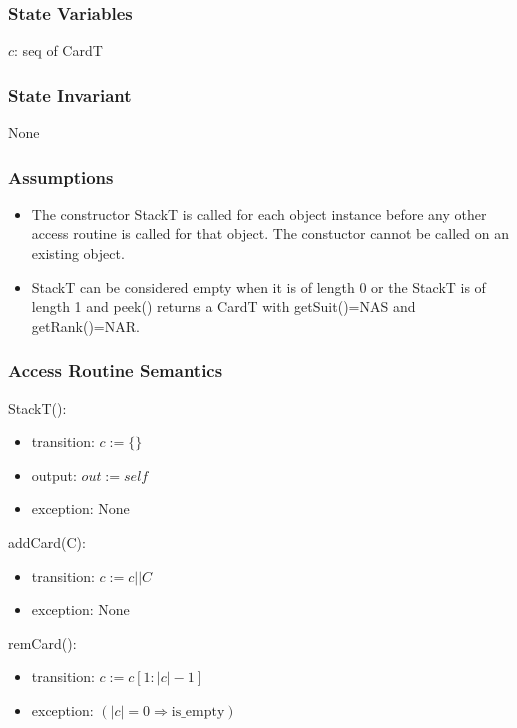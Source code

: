 \documentclass[12pt]{article}
\newcommand{\means}{\Rightarrow}
\newcommand{\m}[1]{\mbox{#1}}
\begin{document}
\subsubsection* {State Variables}

$c$: seq of CardT\\

\subsubsection* {State Invariant}

None

\subsubsection* {Assumptions}

\begin{itemize}
    \item The constructor StackT is called for each object instance
    before any other access routine is called for that object. The
    constuctor cannot be called on an existing object.
    \item StackT can be considered empty when it is of length 0 or the
    StackT is of length 1 and peek() returns a CardT with getSuit()=\m{NAS}
    and getRank()=\m{NAR}.
\end{itemize}

\subsubsection* {Access Routine Semantics}

StackT():
\begin{itemize}
    \item transition: $c := \{\}$
    \item output: $out := \mathit{self}$
    \item exception: None
\end{itemize}

\noindent addCard(C):
\begin{itemize}
    \item transition: $c := c||C$
    \item exception: None
\end{itemize}

\noindent remCard():
\begin{itemize}
    \item transition: $c := c[1:|c|-1]$
    \item exception: $(|c|=0 \means \m{is\_empty})$
\end{itemize}
\end{document}
